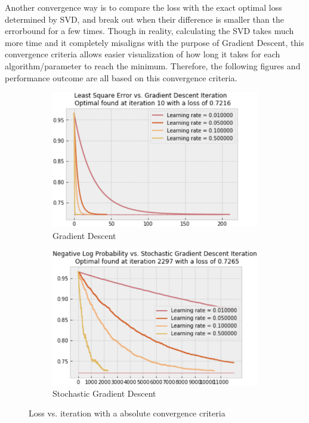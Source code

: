 \documentclass{article} %
\begin{document}
  Another convergence way is to compare the loss with the exact optimal loss determined by SVD, and break out when their difference is smaller than the errorbound for a few times. Though in reality, calculating the SVD takes much more time and it completely misaligns with the purpose of Gradient Descent, this convergence criteria allows easier visualization of how long it takes for each algorithm/parameter to reach the minimum. Therefore, the following figures and performance outcome are all based on this convergence criteria.
  \begin{figure}[!h]
    \centering
    \begin{subfigure}[b]{0.45\linewidth}
      \includegraphics[width=\linewidth]{A3_1_3.png}
      \caption{Gradient Descent}
    \end{subfigure}
    \begin{subfigure}[b]{0.45\linewidth}
      \includegraphics[width=\linewidth]{A3_1_4.png}
      \caption{Stochastic Gradient Descent}
    \end{subfigure}
    \caption{Loss vs. iteration with a absolute convergence criteria}
    \label{fig:Q1_2}
  \end{figure}
\end{document}
